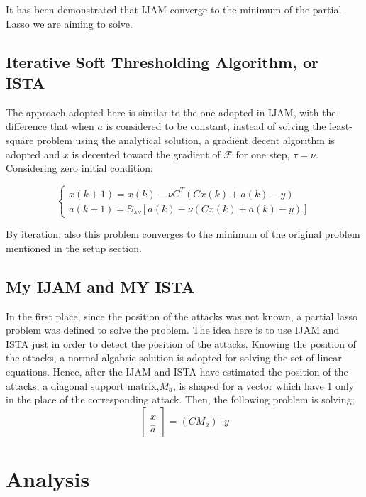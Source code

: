 It has been demonstrated that IJAM converge to the minimum of the partial Lasso we are aiming to solve. 


\subsection{Iterative Soft Thresholding Algorithm, or ISTA}
The approach adopted here is similar to the one adopted in IJAM, with the difference that when $a$ is considered to be constant, instead of solving the least-square problem using the analytical solution, a gradient decent algorithm is adopted and $x$ is decented toward the gradient of $\mathcal{F}$ for one step, $\tau = \nu$. Considering zero initial condition:

\begin{equation}
	\begin{cases}
		x(k+1) = x(k)- \nu C^{T}(Cx(k) + a(k) - y) \\
		a(k+1) = \mathbb{S}_{\lambda \nu}\left[a(k) - \nu(Cx(k)+ a(k) - y)\right]
	\end{cases}
\end{equation}

By iteration, also this problem converges to the minimum of the original problem mentioned in the setup section.

\subsection{My IJAM and MY ISTA}
In the first place, since the position of the attacks was not known, a partial lasso problem was defined to solve the problem. The idea here is to use IJAM and ISTA just in order to detect the position of the attacks. Knowing the position of the attacks, a normal algabric solution is adopted for solving the set of linear equations. Hence, after the IJAM and ISTA have estimated the position of the attacks, a diagonal support matrix,$M_a$, is shaped for a vector which have 1 only in the place of the corresponding attack. Then, the following problem is solving;
\begin{equation}
    \begin{bmatrix}
        \hat{x} \\
        \hat{a}
    \end{bmatrix} = 
    \left( C M_a \right)^{+} y
\end{equation}


\section{Analysis}
